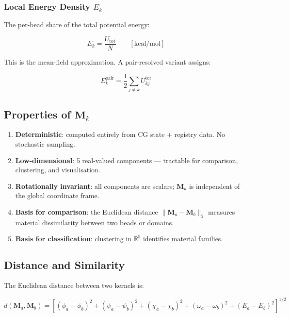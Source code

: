 \documentclass[11pt, a4paper, oneside]{article}
\newcommand{\kcal}{\text{kcal/mol}}
\begin{document}
\subsubsection{Local Energy Density
  \texorpdfstring{$E_k$}{E\_k}}

The per-bead share of the total potential energy:

\begin{equation}
E_k = \frac{U_{\mathrm{tot}}}{N}
\qquad [\kcal]
\label{eq:Ek}
\end{equation}

This is the mean-field approximation.  A pair-resolved variant assigns:

\begin{equation}
E_k^{\mathrm{pair}} = \frac{1}{2}\sum_{j \neq k}
  U_{kj}^{\mathrm{tot}}
\label{eq:Ek_pair}
\end{equation}

\subsection{Properties of \texorpdfstring{$\mathbf{M}_k$}{M\_k}}

\begin{enumerate}
\item \textbf{Deterministic}: computed entirely from CG state +
      registry data.  No stochastic sampling.
\item \textbf{Low-dimensional}: 5 real-valued components — tractable
      for comparison, clustering, and visualisation.
\item \textbf{Rotationally invariant}: all components are scalars;
      $\mathbf{M}_k$ is independent of the global coordinate frame.
\item \textbf{Basis for comparison}: the Euclidean distance
      $\|\mathbf{M}_a - \mathbf{M}_b\|_2$ measures material
      dissimilarity between two beads or domains.
\item \textbf{Basis for classification}: clustering in
      $\mathbb{R}^5$ identifies material families.
\end{enumerate}

\subsection{Distance and Similarity}

The Euclidean distance between two kernels is:

\begin{equation}
d(\mathbf{M}_a, \mathbf{M}_b)
= \left[
  (\phi_a - \phi_b)^2
+ (\psi_a - \psi_b)^2
+ (\chi_a - \chi_b)^2
+ (\omega_a - \omega_b)^2
+ (E_a - E_b)^2
\right]^{1/2}
\label{eq:dist}
\end{equation}
\end{document}
